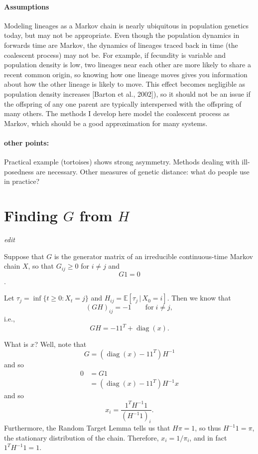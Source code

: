 \documentclass{article}
\DeclareMathOperator{\diag}{\mathop{\mbox{diag}}}
\newcommand{\E}{\mathbb{E}}
\newcommand{\plr}[1]{{\em \color{blue} #1}}
\begin{document}
\paragraph{Assumptions}
Modeling lineages as a Markov chain is nearly ubiquitous in population genetics today,
but may not be appropriate.
Even though the population dynamics in forwards time are Markov, the dynamics of lineages traced back
in time (the coalescent process) may not be. For example, if fecundity is variable and population density
is low, two lineages near each other are more likely to share a recent common origin, so knowing how one
lineage moves gives you information about how the other lineage is likely to move. This effect becomes
negligible as population density increases [Barton et al., 2002]), so it should not be an issue if the offspring
of any one parent are typically interspersed with the offspring of many others. The methods I develop here
model the coalescent process as Markov, which should be a good approximation for many systems.

\paragraph{other points:}
Practical example (tortoises) shows strong asymmetry.
Methods dealing with ill-posedness are necessary.
Other measures of genetic distance: what do people use in practice?





\appendix
\renewcommand{\thefigure}{S\arabic{figure}}
\setcounter{figure}{0}


\section{Finding $G$ from $H$}
\label{apx::hitting_calcs}

\plr{edit}

Suppose that $G$ is the generator matrix of an irreducible continuous-time Markov chain $X$,
so that $G_{ij} \ge 0$ for $i \neq j$ and
$$ G 1 = 0 $$.

Let $\tau_{j} = \inf\{t \ge 0 : X_t = j\}$ and $H_{ij} = \E[\tau_j \,|\, X_0 = i]$.
Then we know that
$$
    (G H)_{ij} = -1 \qquad \text{for} \; i \neq j ,
$$
i.e.,
$$
    GH = - 1 1^T + \diag(x).
$$

What is $x$?  Well, note that
$$
    G = (\diag(x) - 1 1^T) H^{-1}
$$
and so
$$ \begin{aligned}
    0 &= G1 \\
    &= (\diag(x) - 1 1^T) H^{-1} x 
\end{aligned} $$
and so
$$
    x_i = \frac{ 1^T H^{-1} 1 }{ (H^{-1} 1)_i } .
$$
Furthermore,
the Random Target Lemma \citep{aldous} %
tells us that $H \pi = 1$, so thus $H^{-1} 1 = \pi$, the stationary distribution of the chain.
Therefore, $x_i = 1/\pi_i$,
and in fact $1^T H^{-1} 1 = 1$.
\end{document}
